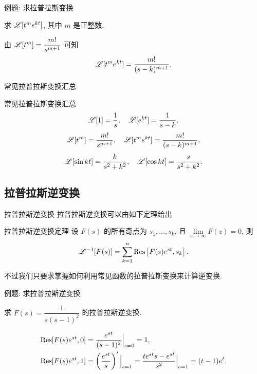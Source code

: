 \begin{frame}{例题: 求拉普拉斯变换}
	\onslide<+->
	\begin{example}
		求 $\mathscr{L}[t^me^{kt}]$, 其中 $m$ 是正整数.
	\end{example}

	\onslide<+->
	\begin{solution}
		由 $\mathscr{L}[t^m]=\dfrac{m!}{s^{m+1}}$ 可知
		\[\mathscr{L}[t^me^{kt}]=\frac{m!}{(s-k)^{m+1}}.\]
	\end{solution}
\end{frame}


\begin{frame}{常见拉普拉斯变换汇总}
	\onslide<+->
	\begin{alertblock}{常见拉普拉斯变换汇总}
		\[\mathscr{L}[1]=\frac1s,\quad \mathscr{L}[e^{kt}]=\frac1{s-k},\]
		\[\mathscr{L}[t^m]=\frac{m!}{s^{m+1}},\quad \mathscr{L}[t^me^{kt}]=\frac{m!}{(s-k)^{m+1}},\]
		\[\mathscr{L}[\sin kt]=\frac{k}{s^2+k^2},\quad
		\mathscr{L}[\cos kt]=\frac{s}{s^2+k^2}.\]
	\end{alertblock}
\end{frame}


\subsection{拉普拉斯逆变换}

\begin{frame}{拉普拉斯逆变换}
	\onslide<+->
	拉普拉斯逆变换可以由如下定理给出
	\begin{block}{拉普拉斯逆变换定理}
		设 $F(s)$ 的所有奇点为 $s_1,\dots,s_k$, 且 $\lim\limits_{z\to\infty}F(z)=0$, 则
		\[\mathscr{L}^{-1}[F(s)]=\sum_{k=1}^n {\mathrm{Res}}\left[F(s)e^{st},s_k\right].\]
	\end{block}

	\onslide<+->
	不过我们只要求掌握如何利用常见函数的拉普拉斯变换来计算逆变换.
\end{frame}


\begin{frame}{例题: 求拉普拉斯逆变换}
	\onslide<+->
	\begin{example}
		求 $F(s)=\dfrac1{s(s-1)^2}$ 的拉普拉斯逆变换.
	\end{example}

	\onslide<+->
	\begin{solution}
			\begin{align*}
				{\mathrm{Res}}[F(s)e^{st},0]&=\frac{e^{st}}{(s-1)^2}\Big|_{s=0}=1,\\
				{\mathrm{Res}}[F(s)e^{st},1]&=\left(\frac{e^{st}}s\right)'\Big|_{s=1}=\frac{te^{st}s-e^{st}}{s^2}\Big|_{s=1}=(t-1)e^t,
			\end{align*}\onslide<+->{故 $\msl^{-1}[F(s)]=1+(t-1)e^t$.
		}
	\end{solution}
\end{frame}


